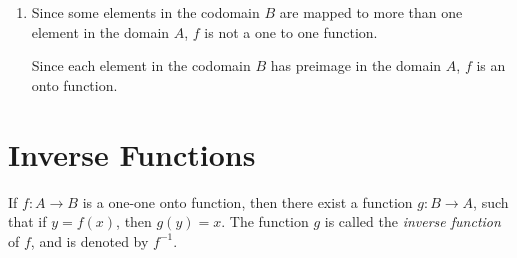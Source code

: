 \documentclass[12pt]{report}
\begin{document}
\begin{enumerate}
\begin{multicols}{2}
\begin{enumerate}
            \item {}
                  \sol{}

                  Since some elements in the codomain $B$ are mapped to more than one element in
                  the domain $A$, $f$ is not a one to one function.

                  Since each element in the codomain $B$ has preimage in the domain $A$, $f$ is
                  an onto function.
          \end{enumerate}
        \end{multicols}
\end{enumerate}

\newpage

\section{Inverse Functions}

\begin{mdframed}[style=MyFrame]
  If $f: A \to B$ is a one-one onto function, then there exist a function $g: B \to A$, such that if $y = f (x)$, then $g(y) = x$. The function $g$ is called the \emph{inverse function} of $f$, and is denoted by $f^{-1}$.
\end{mdframed}
\end{document}
